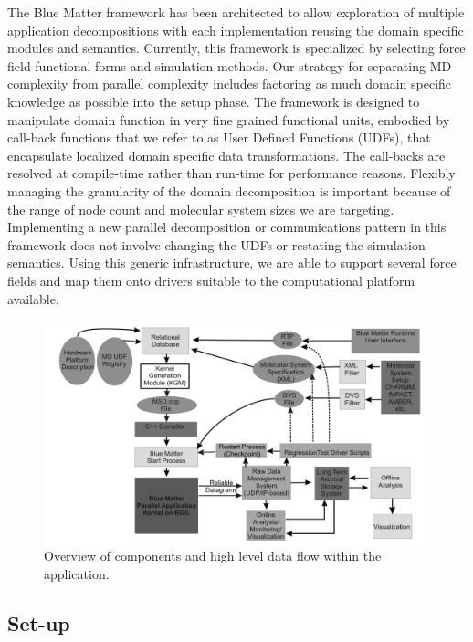 \documentclass[doublespacing]{elsart}
\begin{document}
The Blue Matter framework has been architected to allow exploration of
multiple application decompositions with each implementation reusing
the domain specific modules and semantics.  Currently, this framework
is specialized by selecting force field functional forms and
simulation methods.  Our strategy for separating MD complexity from
parallel complexity includes factoring as much domain specific
knowledge as possible into the setup phase.  The framework is designed
to manipulate domain function in very fine grained functional units,
embodied by call-back functions that we refer to as User Defined
Functions (UDFs), that encapsulate localized domain specific data
transformations.  The call-backs are resolved at compile-time rather
than run-time for performance reasons.  Flexibly managing the
granularity of the domain decomposition is important because of the
range of node count and molecular system sizes we are targeting.
Implementing a new parallel decomposition or communications pattern in
this framework does not involve changing the UDFs or restating the
simulation semantics.  Using this generic infrastructure, we are able
to support several force fields and map them onto drivers suitable to
the computational platform available.

\begin{figure}
\includegraphics[keepaspectratio,
width=\textwidth]{BlueMatterFlow2_paper}
\caption{Overview of components and high level data flow within the application.}
\label{fig:bluematter_overview}
\end{figure}

\subsection{Set-up}
\end{document}
